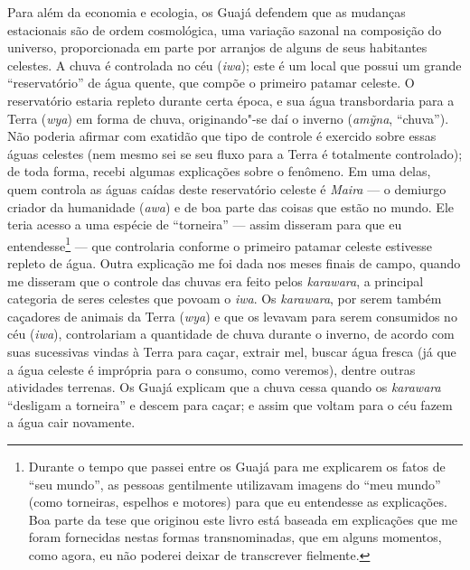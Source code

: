 Para além da economia e ecologia, os Guajá defendem que as mudanças
estacionais são de ordem cosmológica, uma variação sazonal na composição
do universo, proporcionada em parte por arranjos de alguns de seus
habitantes celestes. A chuva é controlada no céu (\emph{iwa}); este é um
local que possui um grande ``reservatório'' de água quente, que compõe o
primeiro patamar celeste. O reservatório estaria repleto durante certa
época, e sua água transbordaria para a Terra (\emph{wya}) em forma de
chuva, originando"-se daí o inverno (\emph{amỹna}, ``chuva''). Não poderia
afirmar com exatidão que tipo de controle é exercido sobre essas águas
celestes (nem mesmo sei se seu fluxo para a Terra é totalmente
controlado); de toda forma, recebi algumas explicações sobre o fenômeno.
Em uma delas, quem controla as águas caídas deste reservatório celeste é
\emph{Maira} --- o demiurgo criador da humanidade (\emph{awa}) e de boa
parte das coisas que estão no mundo. Ele teria acesso a uma espécie de
``torneira'' --- assim disseram para que eu entendesse\footnote{Durante o
  tempo que passei entre os Guajá para me explicarem os fatos de ``seu mundo'', as pessoas gentilmente utilizavam imagens do ``meu mundo'' (como torneiras, espelhos e motores) para que eu entendesse as
  explicações. Boa parte da tese que originou este livro está baseada em
  explicações que me foram fornecidas nestas formas transnominadas, que
  em alguns momentos, como agora, eu não poderei deixar de transcrever
  fielmente.} --- que controlaria conforme o primeiro patamar celeste
estivesse repleto de água. Outra explicação me foi dada nos meses finais
de campo, quando me disseram que o controle das chuvas era feito pelos
\emph{karawara}, a principal categoria de seres celestes que povoam o
\emph{iwa}. Os \emph{karawara}, por serem também caçadores de animais da
Terra (\emph{wya}) e que os levavam para serem consumidos no céu
(\emph{iwa}), controlariam a quantidade de chuva durante o inverno, de
acordo com suas sucessivas vindas à Terra para caçar, extrair mel,
buscar água fresca (já que a água celeste é imprópria para o consumo,
como veremos), dentre outras atividades terrenas. Os Guajá explicam que
a chuva cessa quando os \emph{karawara} ``desligam a torneira'' e descem
para caçar; e assim que voltam para o céu fazem a água cair novamente.

